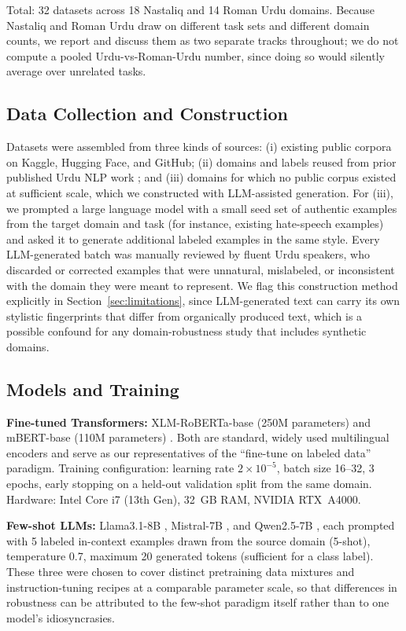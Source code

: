 \documentclass[10pt,twocolumn,journal]{IEEEtran}
\begin{document}
\noindent Total: 32 datasets across 18 Nastaliq and 14 Roman Urdu domains. Because Nastaliq and Roman Urdu draw on different task sets and different domain counts, we report and discuss them as two separate tracks throughout; we do not compute a pooled Urdu-vs-Roman-Urdu number, since doing so would silently average over unrelated tasks.

\subsection{Data Collection and Construction}
Datasets were assembled from three kinds of sources: (i) existing public corpora on Kaggle, Hugging Face, and GitHub; (ii) domains and labels reused from prior published Urdu NLP work \cite{malik2020urdu,Karim2020,hasan2018urdusentilex}; and (iii) domains for which no public corpus existed at sufficient scale, which we constructed with LLM-assisted generation. For (iii), we prompted a large language model with a small seed set of authentic examples from the target domain and task (for instance, existing hate-speech examples) and asked it to generate additional labeled examples in the same style. Every LLM-generated batch was manually reviewed by fluent Urdu speakers, who discarded or corrected examples that were unnatural, mislabeled, or inconsistent with the domain they were meant to represent. We flag this construction method explicitly in Section~\ref{sec:limitations}, since LLM-generated text can carry its own stylistic fingerprints that differ from organically produced text, which is a possible confound for any domain-robustness study that includes synthetic domains.

\subsection{Models and Training}

\textbf{Fine-tuned Transformers:} XLM-RoBERTa-base (250M parameters) \cite{conneau2020unsupervised} and mBERT-base (110M parameters) \cite{pires2019multilingual}. Both are standard, widely used multilingual encoders and serve as our representatives of the ``fine-tune on labeled data'' paradigm. Training configuration: learning rate $2\times10^{-5}$, batch size 16--32, 3 epochs, early stopping on a held-out validation split from the same domain. Hardware: Intel Core i7 (13th Gen), 32~GB RAM, NVIDIA RTX~A4000.

\textbf{Few-shot LLMs:} Llama3.1-8B \cite{grattafiori2024llama}, Mistral-7B \cite{jiang2023mistral}, and Qwen2.5-7B \cite{qwen2024qwen25}, each prompted with 5 labeled in-context examples drawn from the source domain (5-shot), temperature 0.7, maximum 20 generated tokens (sufficient for a class label). These three were chosen to cover distinct pretraining data mixtures and instruction-tuning recipes at a comparable parameter scale, so that differences in robustness can be attributed to the few-shot paradigm itself rather than to one model's idiosyncrasies.
\end{document}
